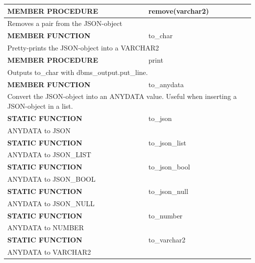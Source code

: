 \documentclass[11pt,twocolumn, a4paper]{article}
\begin{document}
\begin{longtable}{| l | l |}
\hline
  \textbf{MEMBER PROCEDURE} & remove(varchar2)\\
\hline
  \multicolumn{2}{|p{15cm}|}{Removes a pair from the JSON-object} \\
\hline

\hline
  \textbf{MEMBER FUNCTION} & to\_char\\
\hline
  \multicolumn{2}{|p{15cm}|}{Pretty-prints the JSON-object into a VARCHAR2} \\
\hline

\hline
  \textbf{MEMBER PROCEDURE} & print\\
\hline
  \multicolumn{2}{|p{15cm}|}{Outputs to\_char with dbms\_output.put\_line.} \\
\hline

\hline
  \textbf{MEMBER FUNCTION} & to\_anydata\\
\hline
  \multicolumn{2}{|p{15cm}|}{Convert the JSON-object into an ANYDATA value. Useful when inserting a JSON-object in a list.} \\
\hline

\hline
  \textbf{STATIC FUNCTION} & to\_json\\
\hline
  \multicolumn{2}{|p{15cm}|}{ANYDATA to JSON} \\
\hline
\hline
  \textbf{STATIC FUNCTION} & to\_json\_list\\
\hline
  \multicolumn{2}{|p{15cm}|}{ANYDATA to JSON\_LIST} \\
\hline
\hline
  \textbf{STATIC FUNCTION} & to\_json\_bool\\
\hline
  \multicolumn{2}{|p{15cm}|}{ANYDATA to JSON\_BOOL} \\
\hline
\hline
  \textbf{STATIC FUNCTION} & to\_json\_null\\
\hline
  \multicolumn{2}{|p{15cm}|}{ANYDATA to JSON\_NULL} \\
\hline
\hline
  \textbf{STATIC FUNCTION} & to\_number\\
\hline
  \multicolumn{2}{|p{15cm}|}{ANYDATA to NUMBER} \\
\hline
\hline
  \textbf{STATIC FUNCTION} & to\_varchar2\\
\hline
  \multicolumn{2}{|p{15cm}|}{ANYDATA to VARCHAR2} \\
\hline

\end{longtable}
\end{document}
